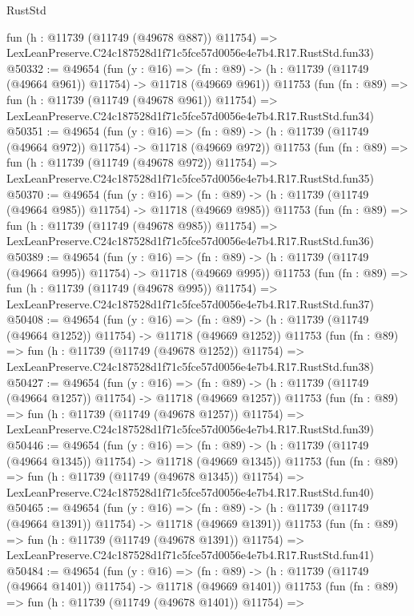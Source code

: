 \begin{lexlean}{RustStd}
\begin{coremodule}
    fun (h : @11739 (@11749 (@49678 @887)) @11754) =>
    LexLeanPreserve.C24c187528d1f71c5fce57d0056e4e7b4.R17.RustStd.fun33)
@50332 := @49654
    (fun (y : @16) =>
    (fn : @89) -> (h : @11739 (@11749 (@49664 @961)) @11754) -> @11718 (@49669 @961))
    @11753
    (fun (fn : @89) =>
    fun (h : @11739 (@11749 (@49678 @961)) @11754) =>
    LexLeanPreserve.C24c187528d1f71c5fce57d0056e4e7b4.R17.RustStd.fun34)
@50351 := @49654
    (fun (y : @16) =>
    (fn : @89) -> (h : @11739 (@11749 (@49664 @972)) @11754) -> @11718 (@49669 @972))
    @11753
    (fun (fn : @89) =>
    fun (h : @11739 (@11749 (@49678 @972)) @11754) =>
    LexLeanPreserve.C24c187528d1f71c5fce57d0056e4e7b4.R17.RustStd.fun35)
@50370 := @49654
    (fun (y : @16) =>
    (fn : @89) -> (h : @11739 (@11749 (@49664 @985)) @11754) -> @11718 (@49669 @985))
    @11753
    (fun (fn : @89) =>
    fun (h : @11739 (@11749 (@49678 @985)) @11754) =>
    LexLeanPreserve.C24c187528d1f71c5fce57d0056e4e7b4.R17.RustStd.fun36)
@50389 := @49654
    (fun (y : @16) =>
    (fn : @89) -> (h : @11739 (@11749 (@49664 @995)) @11754) -> @11718 (@49669 @995))
    @11753
    (fun (fn : @89) =>
    fun (h : @11739 (@11749 (@49678 @995)) @11754) =>
    LexLeanPreserve.C24c187528d1f71c5fce57d0056e4e7b4.R17.RustStd.fun37)
@50408 := @49654
    (fun (y : @16) =>
    (fn : @89) -> (h : @11739 (@11749 (@49664 @1252)) @11754) -> @11718 (@49669 @1252))
    @11753
    (fun (fn : @89) =>
    fun (h : @11739 (@11749 (@49678 @1252)) @11754) =>
    LexLeanPreserve.C24c187528d1f71c5fce57d0056e4e7b4.R17.RustStd.fun38)
@50427 := @49654
    (fun (y : @16) =>
    (fn : @89) -> (h : @11739 (@11749 (@49664 @1257)) @11754) -> @11718 (@49669 @1257))
    @11753
    (fun (fn : @89) =>
    fun (h : @11739 (@11749 (@49678 @1257)) @11754) =>
    LexLeanPreserve.C24c187528d1f71c5fce57d0056e4e7b4.R17.RustStd.fun39)
@50446 := @49654
    (fun (y : @16) =>
    (fn : @89) -> (h : @11739 (@11749 (@49664 @1345)) @11754) -> @11718 (@49669 @1345))
    @11753
    (fun (fn : @89) =>
    fun (h : @11739 (@11749 (@49678 @1345)) @11754) =>
    LexLeanPreserve.C24c187528d1f71c5fce57d0056e4e7b4.R17.RustStd.fun40)
@50465 := @49654
    (fun (y : @16) =>
    (fn : @89) -> (h : @11739 (@11749 (@49664 @1391)) @11754) -> @11718 (@49669 @1391))
    @11753
    (fun (fn : @89) =>
    fun (h : @11739 (@11749 (@49678 @1391)) @11754) =>
    LexLeanPreserve.C24c187528d1f71c5fce57d0056e4e7b4.R17.RustStd.fun41)
@50484 := @49654
    (fun (y : @16) =>
    (fn : @89) -> (h : @11739 (@11749 (@49664 @1401)) @11754) -> @11718 (@49669 @1401))
    @11753
    (fun (fn : @89) =>
    fun (h : @11739 (@11749 (@49678 @1401)) @11754) =>

\end{coremodule}
\end{lexlean}
